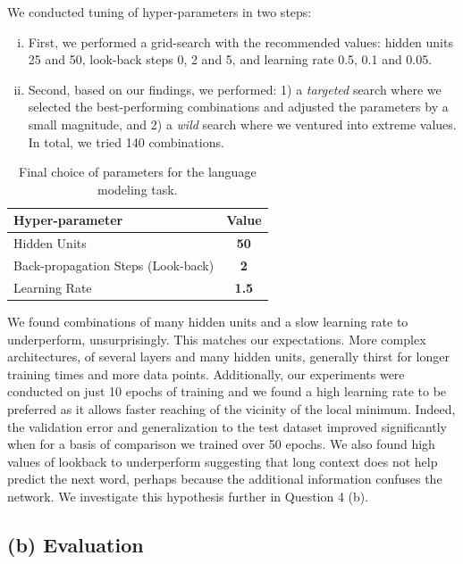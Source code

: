 \documentclass{article}
\begin{document}
We conducted tuning of hyper-parameters in two steps:
\begin{enumerate}[(i)]
\item 
First, we performed a grid-search with the recommended values: hidden units 25 and 50, look-back steps 0, 2 and 5, and learning rate 0.5, 0.1 and 0.05.
\item Second, based on our findings, we performed: 1) a \textit{targeted} search where we selected the best-performing combinations and adjusted the parameters by a small magnitude, and 2) a \textit{wild} search where we ventured into extreme values. In total, we tried 140 combinations.
\end{enumerate}

\begin{table}[h!]
\begin{center}
\begin{scriptsize}
\begin{tabular}{lc}
\hline
\abovespace\belowspace
Hyper-parameter & Value \\
\hline
\abovespace
Hidden Units &  \textbf{50} \\
Back-propagation Steps (Look-back) &  \textbf{2} \\
\belowspace
Learning Rate & \textbf{1.5} \\
\hline
\end{tabular}
\end{scriptsize}
\caption{Final choice of parameters for the language modeling task.}
\end{center}
\end{table}
We found combinations of many hidden units and a slow learning rate to underperform, unsurprisingly. This matches our expectations. More complex architectures, of several layers and many hidden units, generally thirst for longer training times and more data points. Additionally, our experiments were conducted on just 10 epochs of training and we found a high learning rate to be preferred as it allows faster reaching of the vicinity of the local minimum. Indeed, the validation error and generalization to the test dataset improved significantly when for a basis of comparison we trained over 50 epochs. We also found high values of lookback to underperform suggesting that long context does not help predict the next word, perhaps because the additional information confuses the network. We investigate this hypothesis further in Question 4 (b).


\subsection*{(b) Evaluation}
\end{document}
